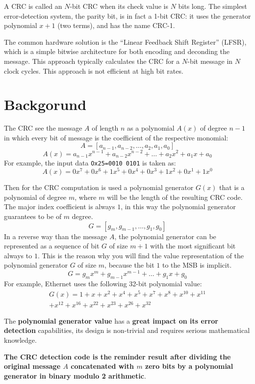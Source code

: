 \documentclass[fleqn]{IEEEtran}
\begin{document}
A CRC is called an $N$-bit CRC when its check value is $N$ bits long. The 
simplest error-detection system, the parity bit, is in fact a 1-bit CRC: 
it uses the generator polynomial $x + 1$ (two terms), and has the name CRC-1.

The common hardware solution is the “Linear Feedback Shift Register” (LFSR), 
which is a simple bitwise architecture for both encoding and deconding the 
message. This approach typically calculates the CRC for a $N$-bit message in 
$N$ clock cycles. This approach is not efficient at high bit rates.


\section{Backgorund}
The CRC see the message $A$ of length $n$ as a polynomial $A(x)$ of degree $n-1$
in which every bit of message is the coefficient of the respective monomial:
\[
   A=[a_{n-1},a_{n-2},\dots{},a_{2},a_{1},a_{0}]
\]
\[
   A(x)=a_{n-1}x^{n-1}+a_{n-2}x^{n-2}+\dots{}+a_{2}x^{2}+a_{1}x+a_{0}
\]
For example, the input data \verb|Ox25=0010 0101| is taken as:
\[
   A(x)=0x^{7}+0x^{6}+1x^{5}+0x^{4}+0x^{3}+1x^{2}+0x^{1}+1x^{0}
\]

Then for the CRC computation is used a polynomial generator $G(x)$ that is a 
polynomial of degree $m$, where $m$ will be the length of the resulting CRC code. 
The major index coefficient is always $1$, in this 
way the polynomial generator guarantees to be of $m$ degree. 
\[
G=[g_{m},g_{m-1},\dots{},g_{1},g_{0}] 
\]
In a reverse way than the message $A$, the polynomial generator can be 
represented as a sequence of bit $G$ of size $m+1$ with the most significant bit 
always to $1$. This is the reason why you will find the value representation 
of the polynomial generator $G$ of size $m$, because the bit $1$ to the MSB is 
implicit.
\[
   G=g_{m}x^{m}+g_{m-1}x^{m-1}+\dots{}+g_{1}x+g_{0}
\]
For example, Ethernet uses the following 32-bit polynomial value:
\begin{gather*}
   G(x)=1+x+x^{2}+x^{4}+x^{5}+x^{7}+x^{8}+x^{10}+x^{11} \\
   +x^{12}+x^{16}+x^{22}+x^{23}+x^{26}+x^{32}
\end{gather*}

The \textbf{polynomial generator value} has a 
\textbf{great impact on its error detection} capabilities, its design is 
non-trivial and requires serious mathematical knowledge.

\textbf{The CRC detection code is the reminder result after dividing the 
original message $A$ concatenated with $m$ zero bits by a polynomial generator
in binary modulo 2 arithmetic}.
\end{document}
